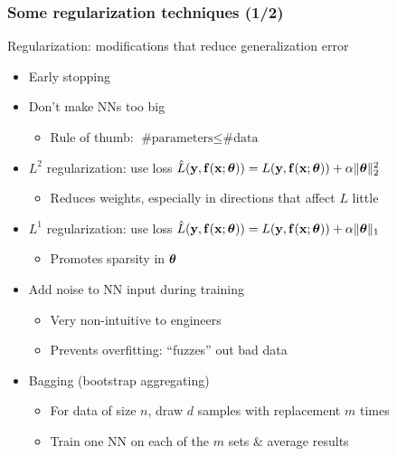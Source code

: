 \begin{frame}
    \frametitle{Some regularization techniques (1/2)}

    \begin{block}{}
        Regularization: modifications that reduce generalization error
    \end{block}

    \begin{itemize}
        \item<+-> Early stopping
        \item<+-> Don't make NNs too big
        \begin{itemize}
            \item Rule of thumb: $\text{\# parameters} \le \text{\# data}$
        \end{itemize}
        \item<+-> $L^2$ regularization: use loss $\hat{L}(\mathbf{y}, \mathbf{f}(\mathbf{x}; \bm{\theta})) = L(\mathbf{y}, \mathbf{f}(\mathbf{x}; \bm{\theta})) + \alpha \|\bm{\theta}\|_2^2$
        \begin{itemize}
            \item Reduces weights, especially in directions that affect $L$ little
        \end{itemize}
        \item<+-> $L^1$ regularization: use loss $\hat{L}(\mathbf{y}, \mathbf{f}(\mathbf{x}; \bm{\theta})) = L(\mathbf{y}, \mathbf{f}(\mathbf{x}; \bm{\theta})) + \alpha \|\bm{\theta}\|_1$
        \begin{itemize}
            \item Promotes sparsity in $\bm{\theta}$
        \end{itemize}
        \item<+-> Add noise to NN input during training \citep{SietsmaNN91}
        \begin{itemize}
            \item Very non-intuitive to engineers
            \item Prevents overfitting: ``fuzzes'' out bad data
        \end{itemize}
        \item<+-> Bagging (bootstrap aggregating) \citep{BreimanML94}
        \begin{itemize}
            \item For data of size $n$, draw $d$ samples with replacement $m$ times
            \item Train one NN on each of the $m$ sets \& average results
        \end{itemize}
    \end{itemize}
\end{frame}

